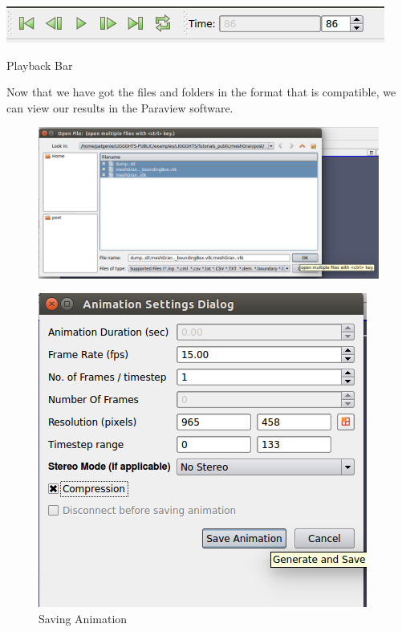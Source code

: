 \documentclass{tufte-book} %
\begin{document}
 \begin{marginfigure}
   \includegraphics[width=\linewidth]{graphics/Screenshot/P4.png}
   \caption{Playback Bar}
 \end{marginfigure}
Now that we have got the files and folders in the format that is compatible, we can view our results in the Paraview software.
\begin{figure}
  \includegraphics[width=\linewidth]{graphics/Screenshot/P2.png}
 
  
\end{figure}
\begin{figure}
  \includegraphics[width=\linewidth]{graphics/Screenshot/P5.png}
  
  \caption{Saving Animation}
  \label{fig:P5}
\end{figure}
\\\vspace{\baselineskip}
\end{document}
